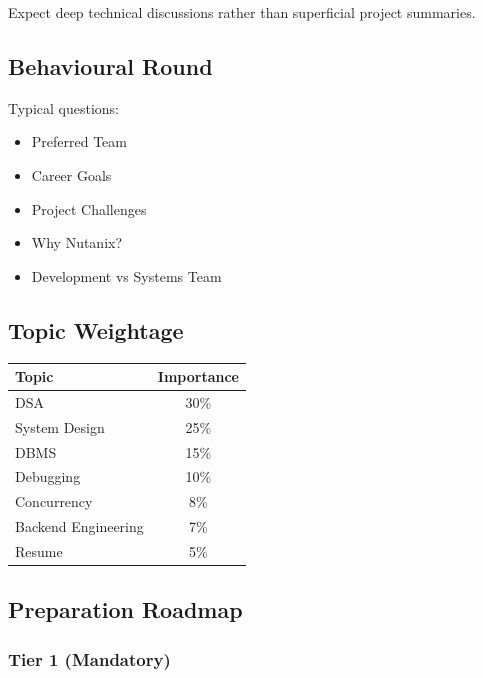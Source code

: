 \documentclass[11pt,a4paper]{article}
\begin{document}
Expect deep technical discussions rather than superficial project summaries.


\subsection{Behavioural Round}

Typical questions:

\begin{itemize}
	\item Preferred Team
	\item Career Goals
	\item Project Challenges
	\item Why Nutanix?
	\item Development vs Systems Team
\end{itemize}


\subsection{Topic Weightage}

\begin{center}
	\begin{tabular}{|l|c|}
		\hline
		Topic & Importance \\
		\hline
		DSA & 30\% \\
		System Design & 25\% \\
		DBMS & 15\% \\
		Debugging & 10\% \\
		Concurrency & 8\% \\
		Backend Engineering & 7\% \\
		Resume & 5\% \\
		\hline
	\end{tabular}
\end{center}


\subsection{Preparation Roadmap}

\subsubsection{Tier 1 (Mandatory)}
\end{document}
